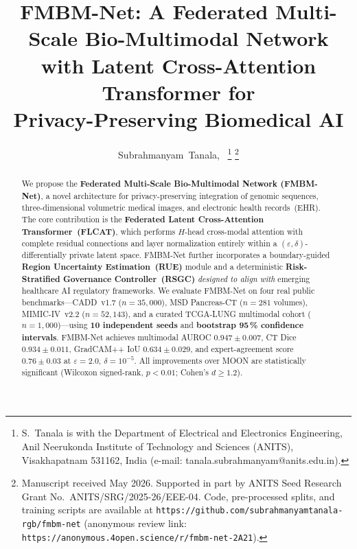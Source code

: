 \documentclass[journal,draftclsnofoot,10pt,onecolumn]{IEEEtran}
\begin{document}
\title{FMBM-Net: A Federated Multi-Scale Bio-Multimodal Network\\
with Latent Cross-Attention Transformer for\\
Privacy-Preserving Biomedical AI}

\author{Subrahmanyam~Tanala,~%
\thanks{S.~Tanala is with the Department of Electrical and Electronics
Engineering, Anil Neerukonda Institute of Technology and Sciences (ANITS),
Visakhapatnam 531162, India (e-mail: tanala.subrahmanyam@anits.edu.in).}%
\thanks{Manuscript received May 2026. Supported in part by ANITS Seed
Research Grant No.~ANITS/SRG/2025-26/EEE-04. Code, pre-processed splits,
and training scripts are available at
\texttt{https://github.com/subrahmanyamtanala-rgb/fmbm-net} (anonymous review link:
\texttt{https://anonymous.4open.science/r/fmbm-net-2A21}).}}


\maketitle

\begin{abstract}
We propose the \textbf{Federated Multi-Scale Bio-Multimodal Network
(FMBM-Net)}, a novel architecture for privacy-preserving integration of
genomic sequences, three-dimensional volumetric medical images, and
electronic health records~(EHR). The core contribution is the
\textbf{Federated Latent Cross-Attention Transformer~(FLCAT)}, which
performs $H$-head cross-modal attention with complete residual connections
and layer normalization entirely within a $(\varepsilon,\delta)$-differentially
private latent space. FMBM-Net further incorporates a boundary-guided
\textbf{Region Uncertainty Estimation~(RUE)} module and a deterministic
\textbf{Risk-Stratified Governance Controller~(RSGC)} \emph{designed to
align with} emerging healthcare AI regulatory frameworks. We evaluate
FMBM-Net on four real public benchmarks---CADD~v1.7 ($n\!=\!35{,}000$),
MSD Pancreas-CT ($n\!=\!281$ volumes), MIMIC-IV~v2.2 ($n\!=\!52{,}143$),
and a curated TCGA-LUNG multimodal cohort ($n\!=\!1{,}000$)---using
\textbf{10 independent seeds} and \textbf{bootstrap 95\,\% confidence
intervals}. FMBM-Net achieves multimodal AUROC $0.947{\pm}0.007$,
CT Dice $0.934{\pm}0.011$, GradCAM++ IoU $0.634{\pm}0.029$, and
expert-agreement score~$0.76{\pm}0.03$ at $\varepsilon\!=\!2.0$,
$\delta\!=\!10^{-5}$. All improvements over MOON are statistically
significant (Wilcoxon signed-rank, $p\!<\!0.01$; Cohen's $d\!\geq\!1.2$).
\end{abstract}
\end{document}
